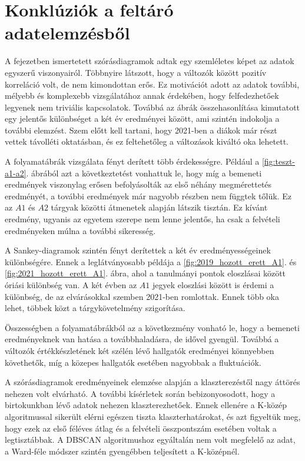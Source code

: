 \documentclass[12pt]{article}
\begin{document}
\section{Konklúziók a feltáró adatelemzésből}

A fejezetben ismertetett szórásdiagramok adtak egy szemléletes képet az adatok egyszerű viszonyairól. Többnyire látszott, hogy a változók között pozitív korreláció volt, de nem kimondottan erős. Ez motivációt adott az adatok további, mélyebb és komplexebb vizsgálatához annak érdekében, hogy felfedezhetőek legyenek nem triviális kapcsolatok. Továbbá az ábrák összehasonlítása kimutatott egy jelentős különbséget a két év eredményei között, ami szintén indokolja a további elemzést. Szem előtt kell tartani, hogy 2021-ben a diákok már részt vettek távolléti oktatásban, és ez feltehetőleg a változások kiváltó oka lehetett.

A folyamatábrák vizsgálata fényt derített több érdekességre. Például a \ref{fig:teszt-a1-a2}. ábrából azt a következtetést vonhattuk le, hogy míg a bemeneti eredmények viszonylag erősen befolyásolták az első néhány megmérettetés eredményét, a további eredmények már nagyobb részben nem függtek tőlük. Ez az $A1$ és $A2$ tárgyak közötti átmenetek alapján látszik tisztán. Ez kívánt eredmény, ugyanis az egyetem szerepe nem lenne jelentős, ha csak a felvételi eredményeken múlna a további sikeresség.

A Sankey-diagramok szintén fényt derítettek a két év eredményességeinek különbségére. Ennek a leglátványosabb példája a \ref{fig:2019_hozott_erett_A1}. és \ref{fig:2021_hozott_erett_A1}. ábra, ahol a tanulmányi pontok eloszlásai között óriási különbség van. A két évben az $A1$ jegyek eloszlási között is érdemi a különbség, de az elvárásokkal szemben 2021-ben romlottak. Ennek több oka lehet, többek közt a tárgykövetelmény szigorítása.

Összességben a folyamatábrákból az a következmény vonható le, hogy a bemeneti eredményeknek van hatása a továbbhaladásra, de idővel gyengül. Továbbá a változók értékkészletének két szélén lévő hallgatók eredményei könnyebben követhetők, míg a közepes hallgatók esetében nagyobbak a fluktuációk.

A szórásdiagramok eredményeinek elemzése alapján a klaszterezéstől nagy áttörés nehezen volt elvárható. A további kísérletek során bebizonyosodott, hogy a birtokunkban lévő adatok nehezen klaszterezhetőek. Ennek ellenére a K-közép algoritmussal sikerült elérni egészen tiszta klaszterhatárokat, és azt figyeltük meg, hogy ezek az első féléves átlag és a felvételi összpontszám esetében voltak a legtisztábbak. A DBSCAN algoritmushoz egyáltalán nem volt megfelelő az adat, a Ward-féle módszer szintén gyengébben teljesített a K-középnél.
\end{document}
